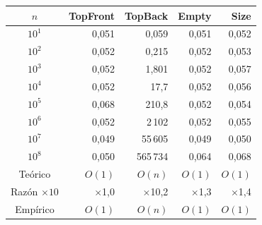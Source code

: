 \begin{tabular}{crrrr}
\toprule
$n$ & \textbf{TopFront} & \textbf{TopBack} & \textbf{Empty} & \textbf{Size} \\
\midrule
$10^{1}$ & 0{,}051 & 0{,}059 & 0{,}051 & 0{,}052 \\
$10^{2}$ & 0{,}052 & 0{,}215 & 0{,}052 & 0{,}053 \\
$10^{3}$ & 0{,}052 & 1{,}801 & 0{,}052 & 0{,}057 \\
$10^{4}$ & 0{,}052 & 17{,}7 & 0{,}052 & 0{,}056 \\
$10^{5}$ & 0{,}068 & 210{,}8 & 0{,}052 & 0{,}054 \\
$10^{6}$ & 0{,}052 & 2\,102 & 0{,}052 & 0{,}055 \\
$10^{7}$ & 0{,}049 & 55\,605 & 0{,}049 & 0{,}050 \\
$10^{8}$ & 0{,}050 & 565\,734 & 0{,}064 & 0{,}068 \\
\midrule
Teórico & $O(1)$ & $O(n)$ & $O(1)$ & $O(1)$ \\
Razón $\times 10$ & $\times$1{,}0 & $\times$10{,}2 & $\times$1{,}3 & $\times$1{,}4 \\
Empírico & $O(1)$ & $O(n)$ & $O(1)$ & $O(1)$ \\
\bottomrule
\end{tabular}